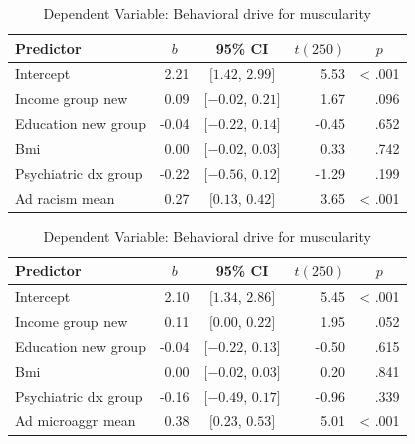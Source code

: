 \documentclass[
  english,
  man, fleqn, noextraspace,floatsintext]{apa6}
\begin{document}
\begin{table}[tbp]

\begin{center}
\begin{threeparttable}

\caption{\label{tab:regression-table}Dependent Variable: Behavioral drive for muscularity}

\begin{tabular}{lrcrr}
\toprule
Predictor & \multicolumn{1}{c}{$b$} & \multicolumn{1}{c}{95\% CI} & \multicolumn{1}{c}{$t(250)$} & \multicolumn{1}{c}{$p$}\\
\midrule
Intercept & 2.21 & $[1.42$, $2.99]$ & 5.53 & < .001\\
Income group new & 0.09 & $[-0.02$, $0.21]$ & 1.67 & .096\\
Education new group & -0.04 & $[-0.22$, $0.14]$ & -0.45 & .652\\
Bmi & 0.00 & $[-0.02$, $0.03]$ & 0.33 & .742\\
Psychiatric dx group & -0.22 & $[-0.56$, $0.12]$ & -1.29 & .199\\
Ad racism mean & 0.27 & $[0.13$, $0.42]$ & 3.65 & < .001\\
\bottomrule
\end{tabular}

\end{threeparttable}
\end{center}

\end{table}

\begin{table}[tbp]

\begin{center}
\begin{threeparttable}

\caption{\label{tab:regression-table}Dependent Variable: Behavioral drive for muscularity}

\begin{tabular}{lrcrr}
\toprule
Predictor & \multicolumn{1}{c}{$b$} & \multicolumn{1}{c}{95\% CI} & \multicolumn{1}{c}{$t(250)$} & \multicolumn{1}{c}{$p$}\\
\midrule
Intercept & 2.10 & $[1.34$, $2.86]$ & 5.45 & < .001\\
Income group new & 0.11 & $[0.00$, $0.22]$ & 1.95 & .052\\
Education new group & -0.04 & $[-0.22$, $0.13]$ & -0.50 & .615\\
Bmi & 0.00 & $[-0.02$, $0.03]$ & 0.20 & .841\\
Psychiatric dx group & -0.16 & $[-0.49$, $0.17]$ & -0.96 & .339\\
Ad microaggr mean & 0.38 & $[0.23$, $0.53]$ & 5.01 & < .001\\
\bottomrule
\end{tabular}

\end{threeparttable}
\end{center}

\end{table}
\end{document}
